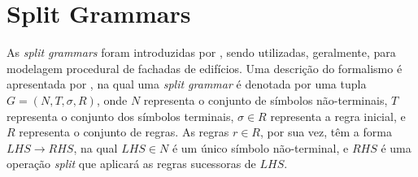 \begin{figure}[h!]
	\centering
	\captionsetup{width=15cm}
	{}	
\end{figure}

\section{Split Grammars}
\label{sec:split_grammar}

As \textit{split grammars} foram introduzidas por , sendo utilizadas, geralmente, para modelagem procedural de fachadas de edifícios. Uma descrição do formalismo é apresentada por , na qual uma \textit{split grammar} é denotada por uma tupla $G = (N, T, \sigma , R)$, onde $N$ representa o conjunto de símbolos não-terminais, $T$ representa o conjunto dos símbolos terminais, $\sigma \in R$ representa a regra inicial, e $R$ representa o conjunto de regras. As regras $r \in R$, por sua vez, têm a forma $LHS \rightarrow RHS$, na qual $LHS \in N$ é um único símbolo não-terminal, e $RHS$ é uma operação \textit{split} que aplicará as regras sucessoras de $LHS$. 

